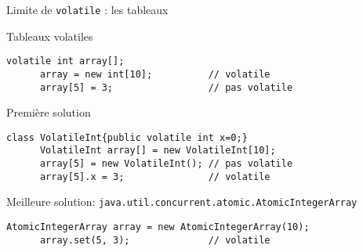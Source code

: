 
\begingroup

\begin{frame}[fragile]{Limite de \lstinline{volatile} : les tableaux}
  \begin{exampleblock}{Tableaux volatiles}
    \begin{lstlisting}[numbers=none]
      volatile int array[];
      array = new int[10];          // volatile
      array[5] = 3;                 // pas volatile
    \end{lstlisting}    
  \end{exampleblock}
  \pause
  \begin{alertblock}{Première solution}
    \begin{lstlisting}[numbers=none]
      class VolatileInt{public volatile int x=0;}
      VolatileInt array[] = new VolatileInt[10];
      array[5] = new VolatileInt(); // pas volatile
      array[5].x = 3;               // volatile
    \end{lstlisting}
  \end{alertblock}
  \pause
  \begin{block}{Meilleure solution: \lstinline{java.util.concurrent.atomic.AtomicIntegerArray}}
    \begin{lstlisting}[numbers=none]
      AtomicIntegerArray array = new AtomicIntegerArray(10);
      array.set(5, 3);              // volatile
    \end{lstlisting}
  \end{block}    
\end{frame}

\endgroup
\endinput
